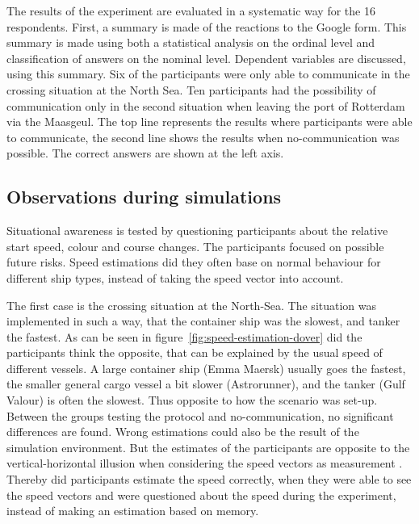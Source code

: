 The results of the experiment are evaluated in a systematic way for the 16 respondents. First, a summary is made of the reactions to the Google form. This summary is made using both a statistical analysis on the ordinal level and classification of answers on the nominal level. Dependent variables are discussed, using this summary. Six of the participants were only able to communicate in the crossing situation at the North Sea. Ten participants had the possibility of communication only in the second situation when leaving the port of Rotterdam via the Maasgeul. The top line represents the results where participants were able to communicate, the second line shows the results when no-communication was possible. The correct answers are shown at the left axis.

\subsection{Observations during simulations}
Situational awareness is tested by questioning participants about the relative start speed, colour and course changes. The participants focused on possible future risks. Speed estimations did they often base on normal behaviour for different ship types, instead of taking the speed vector into account. 

The first case is the crossing situation at the North-Sea. The situation was implemented in such a way, that the container ship was the slowest, and tanker the fastest. As can be seen in figure~\ref{fig:speed-estimation-dover} did the participants think the opposite, that can be explained by the usual speed of different vessels. A large container ship (Emma Maersk) usually goes the fastest, the smaller general cargo vessel a bit slower (Astrorunner), and the tanker (Gulf Valour) is often the slowest. Thus opposite to how the scenario was set-up. Between the groups testing the protocol and no-communication, no significant differences are found.
Wrong estimations could also be the result of the simulation environment. But the estimates of the participants are opposite to the vertical-horizontal illusion when considering the speed vectors as measurement \cite{Prinzmetal1993}. Thereby did participants estimate the speed correctly, when they were able to see the speed vectors and were questioned about the speed during the experiment, instead of making an estimation based on memory.

\newpage


